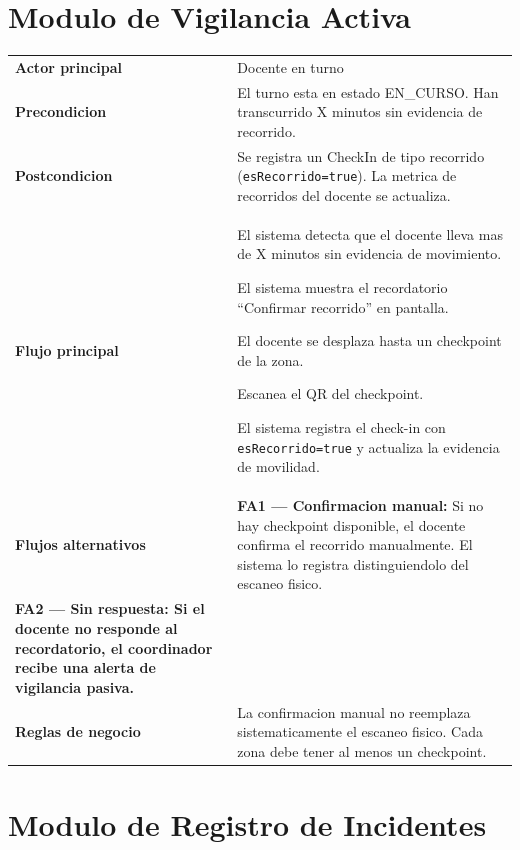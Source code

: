 \documentclass[12pt, a4paper]{article}
\newcommand{\cu}[3]{%
  \begin{tcolorbox}[casousostyle, title={#1},
    after title={\hfill\small\normalfont\color{white!80!azulOscuro}#2}]
  \renewcommand{\arraystretch}{1.35}
  \begin{tabularx}{\linewidth}{>{\bfseries\color{azulOscuro}\small}p{3.6cm} X}
  #3
  \end{tabularx}
  \end{tcolorbox}
  \vspace{6pt}
}
\newcommand{\fcu}[2]{\small\textbf{\color{azulOscuro}#1} & \small #2 \\}
\begin{document}
\newpage

\section{Modulo de Vigilancia Activa}

\cu{CU-06 --- Registrar recorrido activo}{Docente}{
  \fcu{Actor principal}{Docente en turno}
  \fcu{Precondicion}{El turno esta en estado EN\_CURSO. Han transcurrido X minutos sin evidencia de recorrido.}
  \fcu{Postcondicion}{Se registra un CheckIn de tipo recorrido (\texttt{esRecorrido=true}). La metrica de recorridos del docente se actualiza.}
  \fcu{Flujo principal}{
    \begin{pasos}
      \item El sistema detecta que el docente lleva mas de X minutos sin evidencia de movimiento.
      \item El sistema muestra el recordatorio ``Confirmar recorrido'' en pantalla.
      \item El docente se desplaza hasta un checkpoint de la zona.
      \item Escanea el QR del checkpoint.
      \item El sistema registra el check-in con \texttt{esRecorrido=true} y actualiza la evidencia de movilidad.
    \end{pasos}
  }
  \fcu{Flujos alternativos}{
    \textbf{FA1 --- Confirmacion manual:} Si no hay checkpoint disponible, el docente confirma el recorrido manualmente. El sistema lo registra distinguiendolo del escaneo fisico.\\[4pt]
    \textbf{FA2 --- Sin respuesta:} Si el docente no responde al recordatorio, el coordinador recibe una alerta de vigilancia pasiva.
  }
  \fcu{Reglas de negocio}{La confirmacion manual no reemplaza sistematicamente el escaneo fisico. Cada zona debe tener al menos un checkpoint.}
}

\newpage

\section{Modulo de Registro de Incidentes}
\end{document}
